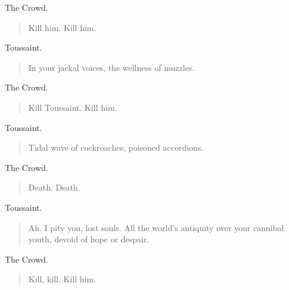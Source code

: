 \documentclass[letterpaper,article,12pt,oneside,notitlepage]{memoir}
\begin{document}
\begin{center}The Crowd.\end{center}

\begin{verse}
Kill him. Kill him. \\
\end{verse}

\begin{center}Toussaint.\end{center}

\begin{verse}
In your jackal voices, the wellness of muzzles. \\
\end{verse}

\begin{center}The Crowd.\end{center}

\begin{verse}
Kill Toussaint. Kill him. \\
\end{verse}

\begin{center}Toussaint.\end{center}

\begin{verse}
Tidal wave of cockroaches, poisoned accordions. \\
\end{verse}

\begin{center}The Crowd.\end{center}

\begin{verse}
Death. Death. \\
\end{verse}

\begin{center}Toussaint.\end{center}

\begin{verse}
\indent Ah. I pity you, lost souls. All the world's antiquity over your cannibal youth, devoid of hope or despair. \\
\end{verse}

\begin{center}The Crowd.\end{center}

\begin{verse}
\hspace{1cm} Kill, kill. Kill him. \\
\end{verse}
\end{document}
